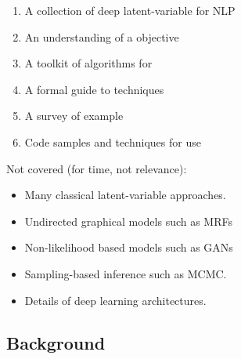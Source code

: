 \begin{frame}{}



 \begin{enumerate}
    \item A collection of deep latent-variable  for NLP
    \air
    
    \item An understanding of a  objective
    \air
    
    \item A toolkit of algorithms for 
    
    \air
    \item A formal guide to  techniques
    \air 
        
    \item A survey of example 
    \air
    
    \item Code samples and techniques for  use
 \end{enumerate}
    
\end{frame}

\begin{frame}{}
    Not covered (for time, not relevance):
    \begin{itemize}
        \item Many classical latent-variable approaches.
            \air
           
            
        \item Undirected graphical models such as MRFs
            \air
        
            
        \item Non-likelihood based models such as GANs
            \air
        
        \item Sampling-based inference such as MCMC.
            \air 

        \item Details of deep learning architectures.
    \end{itemize}
\end{frame}


\subsection{Background}

